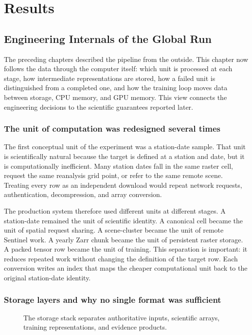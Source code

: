 \documentclass[12pt,a4paper]{report}
\begin{document}
\chapter{Results}
\section{Engineering Internals of the Global Run}

The preceding chapters described the pipeline from the outside. This chapter
now follows the data through the computer itself: which unit is processed at
each stage, how intermediate representations are stored, how a failed unit is
distinguished from a completed one, and how the training loop moves data
between storage, CPU memory, and GPU memory. This view connects the engineering
decisions to the scientific guarantees reported later.

\subsection{The unit of computation was redesigned several times}
The first conceptual unit of the experiment was a station-date sample. That
unit is scientifically natural because the target is defined at a station and
date, but it is computationally inefficient. Many station dates fall in the
same raster cell, request the same reanalysis grid point, or refer to the same
remote scene. Treating every row as an independent download would repeat
network requests, authentication, decompression, and array conversion.

The production system therefore used different units at different stages. A
station-date remained the unit of scientific identity. A canonical cell became
the unit of spatial request sharing. A scene-cluster became the unit of remote
Sentinel work. A yearly Zarr chunk became the unit of persistent raster storage.
A packed tensor row became the unit of training. This separation is important:
it reduces repeated work without changing the definition of the target row.
Each conversion writes an index that maps the cheaper computational unit back
to the original station-date identity.

\subsection{Storage layers and why no single format was sufficient}
\begin{figure}[H]
\centering

\caption{The storage stack separates authoritative inputs, scientific arrays, training representations, and evidence products.}
\label{fig:storage-layers}
\end{figure}
\end{document}

